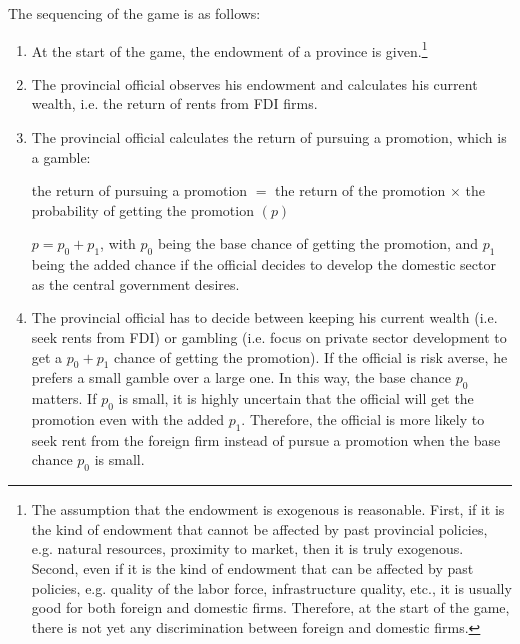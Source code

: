 The sequencing of the game is as follows:
\begin{enumerate}
\item At the start of the game, the endowment of a province is given.\footnote{The assumption that the endowment is exogenous is reasonable. First, if it is the kind of endowment that cannot be affected by past provincial policies, e.g. natural resources, proximity to market, then it is truly exogenous. Second, even if it is the kind of endowment that can be affected by past policies, e.g. quality of the labor force, infrastructure quality, etc., it is usually good for both foreign and domestic firms. Therefore, at the start of the game, there is not yet any discrimination between foreign and domestic firms.}
\item The provincial official observes his endowment and calculates his current wealth, i.e. the return of rents from FDI firms.
\item The provincial official calculates the return of pursuing a promotion, which is a gamble:

the return of pursuing a promotion $=$ the return of the promotion $\times$ the probability of getting the promotion $(p)$

$p = p_0 + p_1$, with $p_0$ being the base chance of getting the promotion, and $p_1$ being the added chance if the official decides to develop the domestic sector as the central government desires.

\item The provincial official has to decide between keeping his current wealth (i.e. seek rents from FDI) or gambling (i.e. focus on private sector development to get a $p_0 + p_1$ chance of getting the promotion). If the official is risk averse, he prefers a small gamble over a large one. In this way, the base chance $p_0$ matters. If $p_0$ is small, it is highly uncertain that the official will get the promotion even with the added $p_1$. Therefore, the official is more likely to seek rent from the foreign firm instead of pursue a promotion when the base chance $p_0$ is small. 
\end{enumerate}

